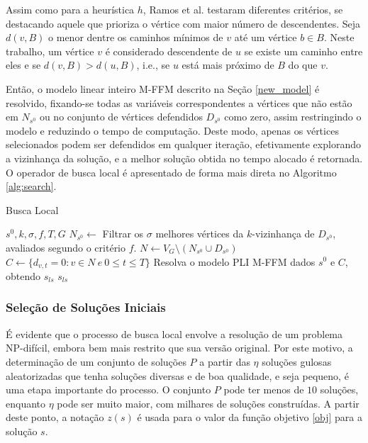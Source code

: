 \documentclass{MO824}
\begin{document}
    Assim como para a heurística $h$, Ramos et al. \cite{matheuristic} testaram diferentes critérios, se destacando aquele que prioriza o vértice com maior número de descendentes. Seja $d(v, B)$ o menor dentre os caminhos mínimos de $v$ até um vértice $b \in B$. Neste trabalho, um vértice $v$ é considerado descendente de $u$ se existe um caminho entre eles e se $d(v, B) > d(u, B)$, i.e., se $u$ está mais próximo de $B$ do que $v$.
    
    Então, o modelo linear inteiro M-FFM descrito na Seção \ref{new_model} é resolvido, fixando-se todas as variáveis correspondentes a vértices que não estão em $N_{s^0}$ ou no conjunto de vértices defendidos $D_{s^0}$ como zero, assim restringindo o modelo e reduzindo o tempo de computação. Deste modo, apenas os vértices selecionados podem ser defendidos em qualquer iteração, efetivamente explorando a vizinhança da solução, e a melhor solução obtida no tempo alocado é retornada. O operador de busca local é apresentado de forma mais direta no Algoritmo \ref{alg:search}.
    
    \begin{algorithm}[H]
    \caption{Busca Local}
    \label{alg:search}
    \begin{algorithmic}[1]
        \REQUIRE $s^0, k, \sigma, f, T, G$
        \STATE $N_{s^0} \leftarrow$ Filtrar os $\sigma$ melhores vértices da $k$-vizinhança de $D_{s^0}$, avaliados segundo o critério $f$.
        \STATE $N \leftarrow V_G \setminus (N_{s^0} \cup D_{s^0})$
        \STATE $C \leftarrow \{d_{v,t} = 0 : v \in N \ e \ 0 \leq t \leq T\}$
        \STATE Resolva o modelo PLI M-FFM dados $s^0$ e $C$, obtendo $s_{ls}$
        \RETURN $s_{ls}$
    \end{algorithmic}
    \end{algorithm}
    
    \subsubsection{Seleção de Soluções Iniciais}
    
    É evidente que o processo de busca local envolve a resolução de um problema NP-difícil, embora bem mais restrito que sua versão original. Por este motivo, a determinação de um conjunto de soluções $P$ a partir das $\eta$ soluções gulosas aleatorizadas que tenha soluções diversas e de boa qualidade, e seja pequeno, é uma etapa importante do processo. O conjunto $P$ pode ter menos de $10$ soluções, enquanto $\eta$ pode ser muito maior, com milhares de soluções construídas. A partir deste ponto, a notação $z(s)$ é usada para o valor da função objetivo \eqref{obj} para a solução $s$.
    
\end{document}
